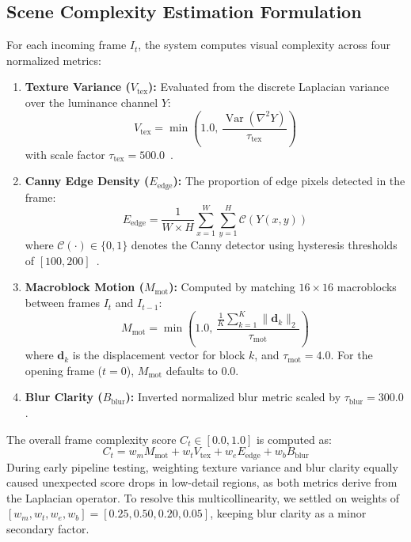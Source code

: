 \documentclass[conference]{IEEEtran}
\begin{document}
\subsection{Scene Complexity Estimation Formulation}
For each incoming frame $I_t$, the system computes visual complexity across four normalized metrics:
\begin{enumerate}
    \item \textbf{Texture Variance ($V_{\text{tex}}$):} Evaluated from the discrete Laplacian variance over the luminance channel $Y$:
    \begin{equation}
    V_{\text{tex}} = \min\left(1.0, \, \frac{\operatorname{Var}(\nabla^2 Y)}{\tau_{\text{tex}}}\right)
    \end{equation}
    with scale factor $\tau_{\text{tex}} = 500.0$~\cite{pecevski2020laplacian}.
    \item \textbf{Canny Edge Density ($E_{\text{edge}}$):} The proportion of edge pixels detected in the frame:
    \begin{equation}
    E_{\text{edge}} = \frac{1}{W \times H} \sum_{x=1}^{W} \sum_{y=1}^{H} \mathcal{C}(Y(x,y))
    \end{equation}
    where $\mathcal{C}(\cdot) \in \{0, 1\}$ denotes the Canny detector using hysteresis thresholds of $[100, 200]$~\cite{canny1986computational}.
    \item \textbf{Macroblock Motion ($M_{\text{mot}}$):} Computed by matching $16 \times 16$ macroblocks between frames $I_t$ and $I_{t-1}$:
    \begin{equation}
    M_{\text{mot}} = \min\left(1.0, \, \frac{\frac{1}{K}\sum_{k=1}^K \|\mathbf{d}_k\|_2}{\tau_{\text{mot}}}\right)
    \end{equation}
    where $\mathbf{d}_k$ is the displacement vector for block $k$, and $\tau_{\text{mot}} = 4.0$. For the opening frame ($t=0$), $M_{\text{mot}}$ defaults to $0.0$.
    \item \textbf{Blur Clarity ($B_{\text{blur}}$):} Inverted normalized blur metric scaled by $\tau_{\text{blur}} = 300.0$.
\end{enumerate}

The overall frame complexity score $C_t \in [0.0, 1.0]$ is computed as:
\begin{equation}
C_t = w_m M_{\text{mot}} + w_t V_{\text{tex}} + w_e E_{\text{edge}} + w_b B_{\text{blur}}
\end{equation}
During early pipeline testing, weighting texture variance and blur clarity equally caused unexpected score drops in low-detail regions, as both metrics derive from the Laplacian operator. To resolve this multicollinearity, we settled on weights of $[w_m, w_t, w_e, w_b] = [0.25, 0.50, 0.20, 0.05]$, keeping blur clarity as a minor secondary factor.
\end{document}
